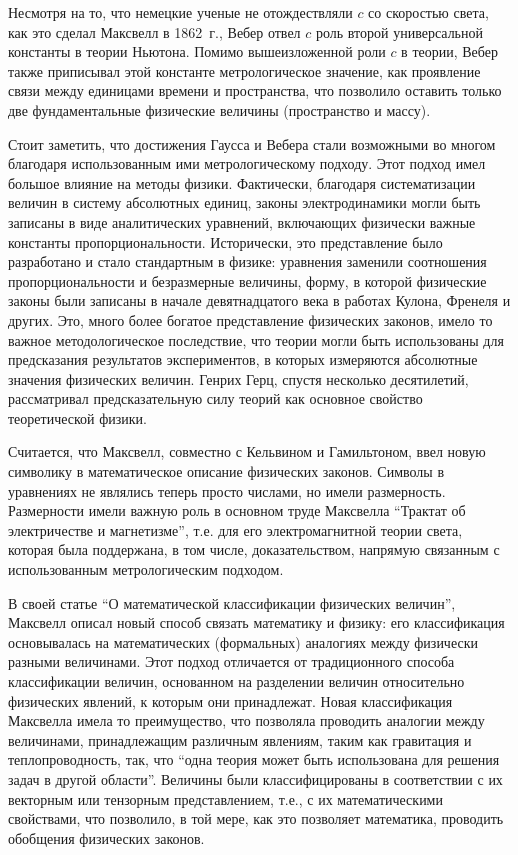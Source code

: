 \documentclass[12pt, oneside, a4paper]{article}
\begin{document}
Несмотря на то, что немецкие ученые не отождествляли $c$ со скоростью света, как это сделал Максвелл в 1862~г., Вебер отвел $c$ роль второй универсальной константы в теории Ньютона. Помимо вышеизложенной роли $c$ в теории, Вебер также приписывал этой константе метрологическое значение, как проявление связи между единицами времени и пространства, что позволило оставить только две фундаментальные физические величины (пространство и массу).

Стоит заметить, что достижения Гаусса и Вебера стали возможными во многом благодаря использованным ими метрологическому подходу. Этот подход имел большое влияние на методы физики. Фактически, благодаря систематизации величин в систему абсолютных единиц, законы электродинамики могли быть записаны в виде аналитических уравнений, включающих физически важные константы пропорциональности. Исторически, это представление было разработано и стало стандартным в физике: уравнения заменили соотношения пропорциональности и безразмерные величины, форму, в которой физические законы были записаны в начале девятнадцатого века в работах Кулона, Френеля и других. Это, много более богатое представление физических законов, имело то важное методологическое последствие, что теории могли быть использованы для предсказания результатов экспериментов, в которых измеряются абсолютные значения физических величин. Генрих Герц, спустя несколько десятилетий, рассматривал предсказательную силу теорий как основное свойство теоретической физики.

Считается, что Максвелл, совместно с Кельвином и Гамильтоном, ввел новую символику в математическое описание физических законов. Символы в уравнениях не являлись теперь просто числами, но имели размерность. Размерности имели важную роль в основном труде Максвелла ``Трактат об электричестве и магнетизме'', т.е. для его электромагнитной теории света, которая была поддержана, в том числе, доказательством, напрямую связанным с использованным метрологическим подходом. 

В своей статье ``О математической классификации физических величин'', Максвелл описал новый способ связать математику и физику: его классификация основывалась на математических (формальных) аналогиях между физически разными величинами. Этот подход отличается от традиционного способа классификации величин, основанном на разделении величин относительно физических явлений, к которым они принадлежат. Новая классификация Максвелла имела то преимущество, что позволяла проводить аналогии между величинами, принадлежащим различным явлениям, таким как гравитация и теплопроводность, так, что ``одна теория может быть использована для решения задач в другой области''. Величины были классифицированы в соответствии с их векторным или тензорным представлением, т.е., с их математическими свойствами, что позволило, в той мере, как это позволяет математика, проводить обобщения физических законов. 
\end{document}
